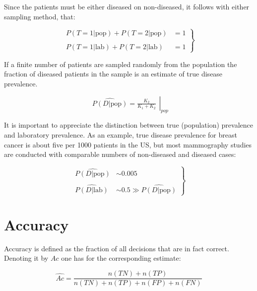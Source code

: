\documentclass[
]{book}
\begin{document}
Since the patients must be either diseased on non-diseased, it follows with either sampling method, that:

\begin{equation} 
\left.\begin{aligned}
P(T=1|\text{pop})+P(T=2|\text{pop})&=1\\
\\
P(T=1|\text{lab})+P(T=2|\text{lab})&=1
\end{aligned}\right\}
\end{equation}

If a finite number of patients are sampled randomly from the population the fraction of diseased patients in the sample is an estimate of true disease prevalence.

\begin{equation} 
\left.\begin{matrix}
\widehat{P(D|\text{pop})}=
\frac{K_2}{K_1+K_2}
\end{matrix}\right|_{pop}
\label{eq:binaryTask0DisPrevEst}
\end{equation}

It is important to appreciate the distinction between true (population) prevalence and laboratory prevalence. As an example, true disease prevalence for breast cancer is about five per 1000 patients in the US, but most mammography studies are conducted with comparable numbers of non-diseased and diseased cases:

\begin{equation} 
\left.\begin{aligned}
\widehat{P(D|\text{pop})}&\sim 0.005\\
\\
\widehat{P(D|\text{lab})}&\sim 0.5\gg \widehat{P(D|\text{pop})}
\end{aligned}\right\}
\label{eq:binaryTask0DisPrevLabVsPop}
\end{equation}

\hypertarget{accuracy}{%
\section{Accuracy}\label{accuracy}}

Accuracy is defined as the fraction of all decisions that are in fact correct. Denoting it by \(Ac\) one has for the corresponding estimate:

\begin{equation} 
\widehat{Ac}=\frac{n(TN)+n(TP)}{n(TN)+n(TP)+n(FP)+n(FN)}
\label{eq:binaryTask0AccuracyEst}
\end{equation}
\end{document}
